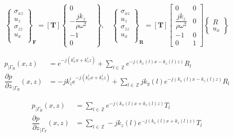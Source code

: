 \documentclass[11pt,A4paper]{book}
\newcommand{\ds}{\displaystyle}
\newcommand{\tb}{\textbf}
\newcommand{\mb}{\, \mathbb}
\newcommand{\esp}{, \quad}
\newcommand{\p}{\partial}
\renewcommand{\:}{\tb{:}}
\begin{document}
\begin{equation}
\left\{
\begin{array}{c}
\sigma_{xz}\\
u_z\\
\sigma_{zz}\\
u_x\\
\end{array}
\right\}_{\tb{F}}=[\tb{T}]\left\{
\begin{array}{ccc}
0 \\
{-\dfrac{jk_z}{\rho\omega^2}}\\
-1&\\
0
\end{array}
\right\}\esp
\left\{
\begin{array}{c}
\sigma_{xz}\\
u_z\\
\sigma_{zz}\\
u_x\\
\end{array}
\right\}_{\tb{R}}=[\tb{T}]\left[
\begin{array}{cc}
0 &0\\
{\dfrac{jk_z}{\rho\omega^2}}&0\\
-1&0\\
0&1
\end{array}
\right]\left\{
\begin{array}{c}
R\\
u_x
\end{array}
\right\}
\end{equation}











\newpage

\begin{align}
p_{|\Gamma_R}(x,z)&=e^{-j(k_x^i x+k_z^i z)}+\ds{\sum_{l\in\mb{Z}}} e^{-j(k_x(l)x-k_z(l)z) } R_l\\
{\dfrac{\p p }{\p z}}_{|\Gamma_R}(x,z)&=-jk_z^ie^{-j(k_x^i x+k_z^i z)}+\ds{\sum_{l\in\mb{Z}}} jk_y(l)e^{-j(k_x(l)x-k_z(l)z) } R_l
\end{align}




\begin{align}
p_{|\Gamma_R}(x,z)&=\ds{\sum_{l\in\mb{Z}}} e^{-j(k_x(l)x+k_z(l)z) } T_l\\
{\dfrac{\p p }{\p z}}_{|\Gamma_T}(x,z)&=\ds{\sum_{l\in\mb{Z}}} -jk_z(l)e^{-j(k_x(l)x+k_z(l)z) } T_l
\end{align}
\end{document}
